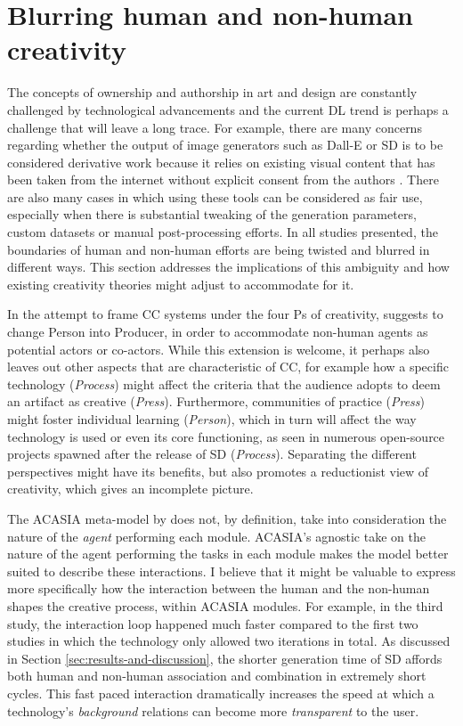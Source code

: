 \section{Blurring human and non-human creativity}\label{sec:blurring-human-and-non-human-creativity} 
The concepts of ownership and authorship in art and design are constantly challenged by technological advancements and the current DL trend is perhaps a challenge that will leave a long trace. For example, there are many concerns regarding whether the output of image generators such as Dall-E or SD is to be considered derivative work because it relies on existing visual content that has been taken from the internet without explicit consent from the authors \citep{Brittain2023}. There are also many cases in which using these tools can be considered as fair use, especially when there is substantial tweaking of the generation parameters, custom datasets or manual post-processing efforts. In all studies presented, the boundaries of human and non-human efforts are being twisted and blurred in different ways. This section addresses the implications of this ambiguity and how existing creativity theories might adjust to accommodate for it.

In the attempt to frame CC systems under the four Ps of creativity, \cite{Jordanous2016} suggests to change Person into Producer, in order to accommodate non-human agents as potential actors or co-actors. While this extension is welcome, it perhaps also leaves out other aspects that are characteristic of CC, for example how a specific technology (\emph{Process}) might affect the criteria that the audience adopts to deem an artifact as creative (\emph{Press}). Furthermore, communities of practice (\emph{Press}) might foster individual learning (\emph{Person}), which in turn will affect the way technology is used or even its core functioning, as seen in numerous open-source projects spawned after the release of SD (\emph{Process}). Separating the different perspectives might have its benefits, but  	also promotes a reductionist view of creativity, which gives an incomplete picture.

The ACASIA meta-model by \cite{Hoorn2014} does not, by definition, take into consideration the nature of the \emph{agent} performing each module. ACASIA's agnostic take on the nature of the agent performing the tasks in each module makes the model better suited to describe these interactions. I believe that it might be valuable to express more specifically how the interaction between the human and the non-human shapes the creative process, within ACASIA modules. For example, in the third study, the interaction loop happened much faster compared to the first two studies in which the technology only allowed two iterations in total. As discussed in Section \ref{sec:results-and-discussion}, the shorter generation time of SD affords both human and non-human association and combination in extremely short cycles. This fast paced interaction dramatically increases the speed at which a technology's \emph{background} relations can become more \emph{transparent} to the user.


